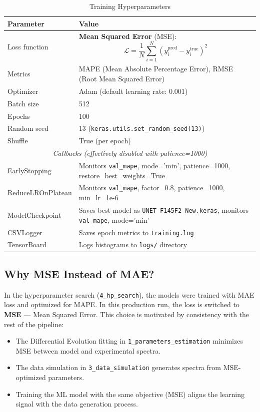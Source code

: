 \documentclass[11pt,a4paper]{article}
\begin{document}
\begin{table}[H]
\centering
\caption{Training Hyperparameters}
\begin{tabular}{ll}
\toprule
\textbf{Parameter} & \textbf{Value} \\
\midrule
Loss function & \textbf{Mean Squared Error} (MSE):
\begin{equation*}
\mathcal{L} = \frac{1}{N}\sum_{i=1}^{N}(y_i^{\text{pred}} - y_i^{\text{true}})^2
\end{equation*} \\
Metrics & MAPE (Mean Absolute Percentage Error), RMSE (Root Mean Squared Error) \\
Optimizer & Adam (default learning rate: 0.001) \\
Batch size & 512 \\
Epochs & 100 \\
Random seed & 13 ({\tt keras.utils.set\_random\_seed(13)}) \\
Shuffle & True (per epoch) \\
\midrule
\multicolumn{2}{c}{\textit{Callbacks (effectively disabled with patience=1000)}} \\
\midrule
EarlyStopping & Monitors {\tt val\_mape}, mode='min', patience=1000, restore\_best\_weights=True \\
ReduceLROnPlateau & Monitors {\tt val\_mape}, factor=0.8, patience=1000, min\_lr=1e-6 \\
ModelCheckpoint & Saves best model as \texttt{UNET-F145F2-New.keras}, monitors {\tt val\_mape}, mode='min' \\
CSVLogger & Saves epoch metrics to \texttt{training.log} \\
TensorBoard & Logs histograms to \texttt{logs/} directory \\
\bottomrule
\end{tabular}
\end{table}

\subsection{Why MSE Instead of MAE?}

In the hyperparameter search (\texttt{4\_hp\_search}), the models were trained with MAE loss and optimized for MAPE. In this production run, the loss is switched to \textbf{MSE} — Mean Squared Error. This choice is motivated by consistency with the rest of the pipeline:

\begin{itemize}
    \item The Differential Evolution fitting in \texttt{1\_parameters\_estimation} minimizes MSE between model and experimental spectra.
    \item The data simulation in \texttt{3\_data\_simulation} generates spectra from MSE-optimized parameters.
    \item Training the ML model with the same objective (MSE) aligns the learning signal with the data generation process.
\end{itemize}
\end{document}
